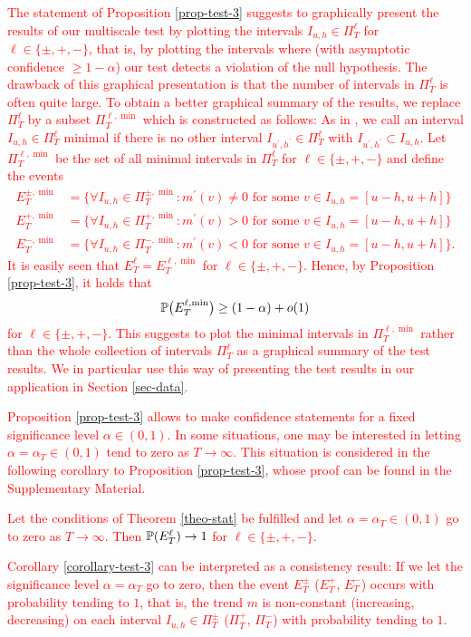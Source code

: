 \begin{remark}
\textcolor{red}{The statement of Proposition \ref{prop-test-3} suggests to graphically present the results of our multiscale test by plotting the intervals $I_{u,h} \in \Pi_T^\ell$ for $\ell \in \{\pm, +,-\}$, that is, by plotting the intervals where (with asymptotic confidence $\ge 1-\alpha$) our test detects a violation of the null hypothesis. The drawback of this graphical presentation is that the number of intervals in $\Pi_T^\ell$ is often quite large. To obtain a better graphical summary of the results, we replace $\Pi_T^\ell$ by a subset $\Pi_T^{\ell,\min}$ which is constructed as follows: As in \cite{Duembgen2002}, we call an interval $I_{u,h} \in \Pi_T^\ell$ minimal if there is no other interval $I_{u^\prime,h^\prime} \in \Pi_T^\ell$ with $I_{u^\prime,h^\prime} \subset I_{u,h}$. Let $\Pi_T^{\ell,\min}$ be the set of all minimal intervals in $\Pi_T^\ell$ for $\ell \in \{\pm, +,-\}$ and define the events
\begin{align*}
E_T^{\pm,\min} & = \Big\{ \forall I_{u,h} \in \Pi_T^{\pm,\min}: m^\prime(v) \ne 0 \text{ for some } v \in I_{u,h} = [u-h,u+h] \Big\} \\
E_T^{+,\min} & = \Big\{ \forall I_{u,h} \in \Pi_T^{+,\min}: m^\prime(v) > 0 \text{ for some } v \in I_{u,h} = [u-h,u+h] \Big\} \\ 
E_T^{-,\min} & = \Big\{ \forall I_{u,h} \in \Pi_T^{-,\min}: m^\prime(v) < 0 \text{ for some } v \in I_{u,h} = [u-h,u+h] \Big\}.  
\end{align*}
It is easily seen that $E_T^\ell = E_T^{\ell,\min}$ for $\ell \in \{\pm, +,-\}$. Hence, by Proposition \ref{prop-test-3}, it holds that 
\[ \mathbb{P} \big(E_T^{\ell,\min}\big) \ge (1-\alpha) + o(1) \] 
for $\ell \in \{\pm, +,-\}$. This suggests to plot the minimal intervals in $\Pi_T^{\ell,\min}$ rather than the whole collection of intervals $\Pi_T^\ell$ as a graphical summary of the test results. We in particular use this way of presenting the test results in our application in Section \ref{sec-data}.}
\end{remark}


\textcolor{red}{Proposition \ref{prop-test-3} allows to make confidence statements for a fixed significance level $\alpha \in (0,1)$. In some situations, one may be interested in letting $\alpha = \alpha_T \in (0,1)$ tend to zero as $T \rightarrow \infty$. This situation is considered in the following corollary to Proposition \ref{prop-test-3}, whose proof can be found in the Supplementary Material. 
\begin{corollary}\label{corollary-test-3}
Let the conditions of Theorem \ref{theo-stat} be fulfilled and let $\alpha = \alpha_T \in (0,1)$ go to zero as $T \rightarrow \infty$. Then $\mathbb{P} (E_T^\ell) \rightarrow 1$ for $\ell \in \{ \pm,+,-\}$. 
\end{corollary}
Corollary \ref{corollary-test-3} can be interpreted as a consistency result: If we let the significance level $\alpha = \alpha_T$ go to zero, then the event $E_T^{\pm}$ ($E_T^+$, $E_T^-$) occurs with probability tending to $1$, that is, the trend $m$ is non-constant (increasing, decreasing) on each interval $I_{u,h} \in \Pi_T^\pm$ ($\Pi_T^+$, $\Pi_T^-$) with probability tending to $1$.} 


